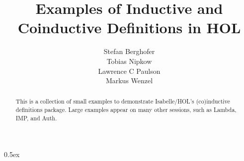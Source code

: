 \documentclass[11pt,a4paper]{article}
\begin{document}
\title{Examples of Inductive and Coinductive Definitions in HOL}
\author{Stefan Berghofer \\ Tobias Nipkow \\ Lawrence C Paulson \\ Markus Wenzel}
\maketitle

\begin{abstract}
  This is a collection of small examples to demonstrate Isabelle/HOL's
  (co)inductive definitions package.  Large examples appear on many other
  sessions, such as Lambda, IMP, and Auth.
\end{abstract}

\tableofcontents
\newpage

\parindent 0pt\parskip 0.5ex

\end{document}
